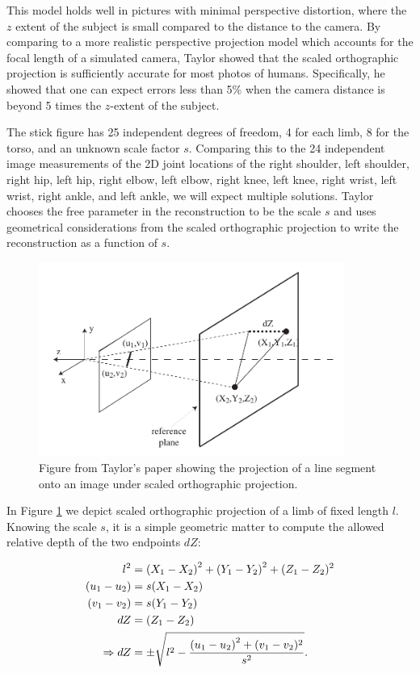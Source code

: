 \documentclass[final]{article}
\begin{document}
\begin{spacing}{1.1}
This model holds well in pictures with minimal perspective distortion, where the $z$ extent of the subject is small compared to the distance to the camera. By comparing to a more realistic perspective projection model which accounts for the focal length of a simulated camera, Taylor showed that the scaled orthographic projection is sufficiently accurate for most photos of humans. Specifically, he showed that one can expect errors less than 5\% when the camera distance is beyond 5 times the $z$-extent of the subject.

The stick figure has 25 independent degrees of freedom, 4 for each limb, 8 for the torso, and an unknown scale factor $s$. Comparing this to the 24 independent image measurements of the 2D joint locations of the right shoulder, left shoulder, right hip, left hip, right elbow, left elbow, right knee, left knee, right wrist, left wrist, right ankle, and left ankle, we will expect multiple solutions. Taylor chooses the free parameter in the reconstruction to be the scale $s$ and uses geometrical considerations from the scaled orthographic projection to write the reconstruction as a function of $s$.

\begin{figure}[h]
  \centering
  \includegraphics[width=10cm]{fig/projection.png}
  \caption{Figure from Taylor's paper\cite{Taylor} showing the projection of a line segment onto an image under scaled orthographic projection.}
  \label{fig:unproject}
\end{figure}

In Figure \ref{fig:unproject} we depict scaled orthographic projection of a limb of fixed length $l$. Knowing the scale $s$, it is a simple geometric matter to compute the allowed relative depth of the two endpoints $dZ$:

\begin{align}
  l^2 &= \qty(X_1 - X_2)^2 + \qty(Y_1 - Y_2)^2 + (Z_1 - Z_2)^2 \\
  (u_1 - u_2) &=  s(X_1 - X_2) \\
  (v_1 - v_2) &= s(Y_1 - Y_2) \\
  dZ &=  (Z_1 - Z_2) \\
  \Rightarrow dZ &= \pm\sqrt{l^2 - \frac{\qty(u_1 - u_2)^2 + (v_1 - v_2)^2}{s^2}}.
  \label{eq:dZ}
\end{align}


\end{spacing}
\end{document}

